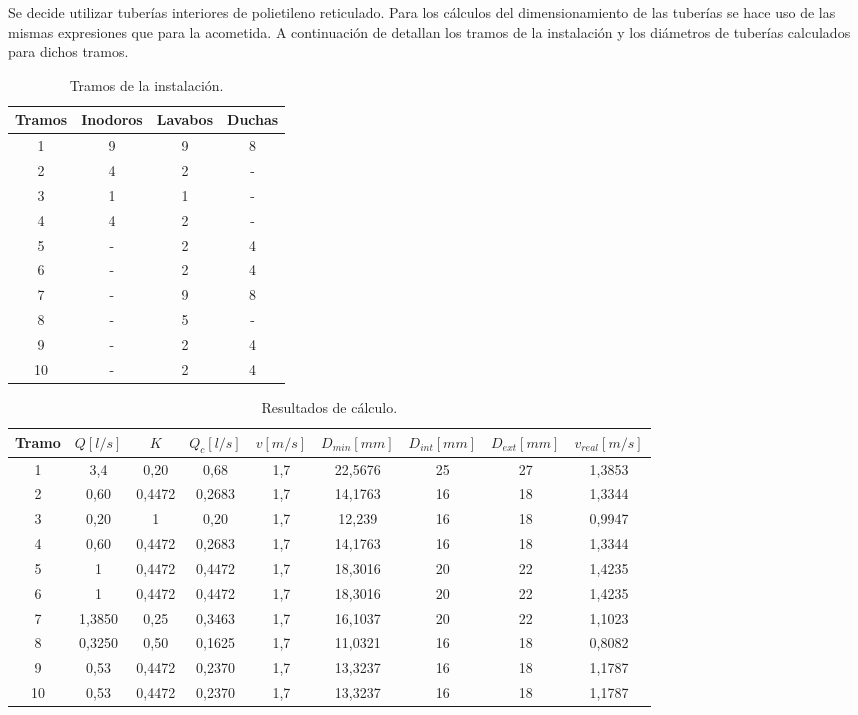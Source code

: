 \documentclass[../main.tex]{subfiles}
\begin{document}
Se decide utilizar tuberías interiores de polietileno reticulado. Para los cálculos del dimensionamiento de las tuberías se hace uso de las mismas expresiones que para la acometida. A continuación de detallan los tramos de la instalación y los diámetros de tuberías calculados para dichos tramos.

\begin{table}[H]
    \centering
    \begin{tabular}{c | c | c | c}
         Tramos & Inodoros & Lavabos & Duchas \\ \hline
         1 & 9 & 9 & 8 \\ 
         2 & 4 & 2 & - \\ 
         3 & 1 & 1 & - \\ 
         4 & 4 & 2 & - \\ 
         5 & - & 2 & 4 \\ 
         6 & - & 2 & 4 \\ 
         7 & - & 9 & 8 \\
         8 & - & 5 & - \\ 
         9 & - & 2 & 4\\ 
         10 & - & 2 & 4 \\ 
    \end{tabular}
    \caption{Tramos de la instalación.}
\end{table}

\begin{table}[H]
    \centering
    \begin{tabular}{c | c | c | c | c | c | c | c | c}
         Tramo & $Q [l/s]$ & $K$ & $Q_c [l/s]$ & $v [m/s]$ & $D_{min} [mm]$ & $D_{int} [mm]$ & $D_{ext} [mm]$ & $v_{real} [m/s]$ \\ \hline
         1 & 3,4 & 0,20 & 0,68 & 1,7 & 22,5676 & 25 & 27 & 1,3853 \\
         2 & 0,60 & 0,4472 & 0,2683 & 1,7 & 14,1763 & 16 & 18 & 1,3344\\
         3 & 0,20 & 1 & 0,20 & 1,7 & 12,239 & 16 & 18 & 0,9947\\
         4 & 0,60 & 0,4472 & 0,2683 & 1,7 & 14,1763 & 16 & 18 & 1,3344 \\
         5 & 1 & 0,4472 & 0,4472 & 1,7 & 18,3016 & 20 & 22 & 1,4235 \\
         6 & 1 & 0,4472 & 0,4472 & 1,7 & 18,3016 & 20 & 22 & 1,4235\\
         7 & 1,3850 & 0,25 & 0,3463 & 1,7 & 16,1037 & 20 & 22 & 1,1023\\
         8 & 0,3250 & 0,50 & 0,1625 & 1,7 & 11,0321 & 16 & 18 & 0,8082\\
         9 & 0,53 & 0,4472 & 0,2370 & 1,7 & 13,3237 & 16 & 18 & 1,1787\\
         10 & 0,53 & 0,4472 & 0,2370 & 1,7 & 13,3237 & 16 & 18 & 1,1787\\
    \end{tabular}
    \caption{Resultados de cálculo.}
\end{table}
\end{document}
